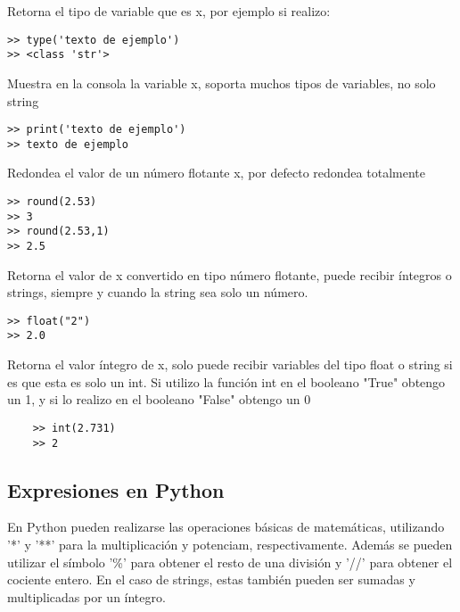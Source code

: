 \documentclass[10pt,a4paper]{article}
\begin{document}
\begin{description}[align=right,labelwidth=1cm,labelsep=0.5cm, itemindent=0cm]


\item [type(x)] Retorna el tipo de variable que es x, por ejemplo si realizo:
\begin{lstlisting}
>> type('texto de ejemplo')
>> <class 'str'>\end{lstlisting}
\item [print(x)] Muestra en la consola la variable x, soporta muchos tipos de variables, no solo string
\begin{lstlisting}
>> print('texto de ejemplo')
>> texto de ejemplo\end{lstlisting}
\item [round(x)] Redondea el valor de un número flotante x, por defecto redondea totalmente
\begin{lstlisting}
>> round(2.53)
>> 3
>> round(2.53,1)
>> 2.5\end{lstlisting}
\item [float(x)] Retorna el valor de x convertido en tipo número flotante, puede recibir íntegros o strings, siempre y cuando la string sea solo un número.
\begin{lstlisting}
>> float("2")
>> 2.0\end{lstlisting}
    
\item [int(x)] Retorna el valor íntegro de x, solo puede recibir variables del tipo float o string si es que esta es solo un int. Si utilizo la función int en el booleano "True" obtengo un 1, y si lo realizo en el booleano "False" obtengo un 0
	\begin{lstlisting}
	>> int(2.731)
	>> 2\end{lstlisting}
    

\end{description}

\subsection{Expresiones en Python}
En Python pueden realizarse las operaciones básicas de matemáticas, utilizando '*' y '**' para la multiplicación y potenciam, respectivamente. Además se pueden utilizar el símbolo '\%' para obtener el resto de una división y '//' para obtener el cociente entero. En el caso de strings, estas también pueden ser sumadas y multiplicadas por un íntegro.
\end{document}
